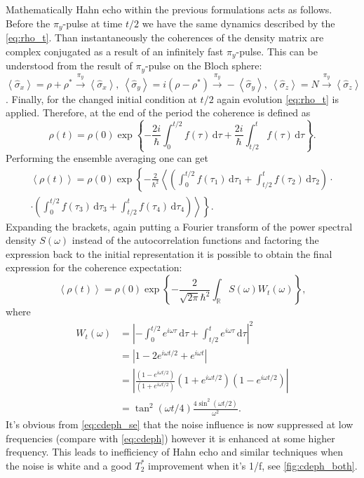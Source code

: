 \documentclass[12pt]{report}
\newcommand{\diff}{\,\mathrm{d}}
\numberwithin{equation}{section}
\begin{document}
Mathematically Hahn echo within the previous formulations acts as follows. Before the  $\pi_y$-pulse at time $t/2$ we have the same dynamics described by the \eqref{eq:rho_t}. Than instantaneously the coherences of the density matrix are complex conjugated as a result of an infinitely fast $\pi_y$-pulse. This can be understood from the result of $\pi_y$-pulse on the Bloch sphere: $\left< \hat \sigma_x \right> = \rho + \rho^* \overset{\pi_y}{\rightarrow}  \left< \hat \sigma_x \right>,\ \left< \hat \sigma_y \right> = i(\rho - \rho^*) \overset{\pi_y}{\rightarrow} -\left< \hat \sigma_y \right>,\ \left< \hat \sigma_z \right> = N  \overset{\pi_y}{\rightarrow}  \left< \hat \sigma_z \right>$. Finally, for the changed initial condition at $t/2$ again evolution \eqref{eq:rho_t} is applied. Therefore, at the end of the period the coherence is defined as
\begin{equation*}
\rho(t) = \rho(0)\exp \left\{ - \frac{2i}{\hbar}\int_0^{t/2} f(\tau)  \diff \tau + \frac{2i}{\hbar}\int_{t/2}^{t} f(\tau)  \diff \tau \right\}.
\end{equation*}
Performing the ensemble averaging one can get
\begin{gather*}
\left<\rho(t)\right> = \rho(0)\exp \left\{ - \frac{2}{\hbar^2} \left< \left( \int_0^{t/2} f(\tau_1)  \diff \tau_1 + \int_{t/2}^{t} f(\tau_2)  \diff \tau_2 \right)\cdot \right. \right. \\
\cdot \left. \left. \left( \int_0^{t/2} f(\tau_3)  \diff \tau_3 + \int_{t/2}^{t} f(\tau_4)  \diff \tau_4 \right) \right> \right\}.
\end{gather*}
Expanding the brackets, again putting a Fourier transform of the power spectral density $S(\omega)$ instead of the autocorrelation functions and factoring the expression back to the initial representation it is possible to obtain\cite{Preskill} the final expression for the coherence expectation:
\begin{equation}
\left<\rho(t)\right> = \rho(0)\exp \left\{ - \frac{2}{\sqrt{2\pi} \hbar^2} \int_\mathbb{R} S(\omega) W_t (\omega) \right\},
\label{eq:cdeph_se}
\end{equation}
where
\begin{align*}
 W_t (\omega)  &= \left| - \int_0^{t/2} e^{i \omega \tau}\diff \tau + \int_{t/2}^{t} e^{i\omega\tau}  \diff \tau  \right|^2 \\
& =  \left| 1-2e^{i\omega t/2} + e^{i\omega t} \right| \\
&= \left| \frac{(1-e^{i\omega t/2})}{(1+e^{i\omega t/2})} (1+e^{i\omega t/2})(1-e^{i\omega t/2})\right|\\
& = \tan^2(\omega t/4)\frac{4 \sin^2(\omega t/2)}{\omega^2}.
\end{align*}
It's obvious from \eqref{eq:cdeph_se}  that the noise influence is now suppressed at low frequencies (compare with \eqref{eq:cdeph}) however it is enhanced at some higher frequency. This leads to inefficiency of Hahn echo and similar techniques when the noise is white and a good $T_2^*$ improvement when it's 1/f, see \autoref{fig:cdeph_both}.
\end{document}
